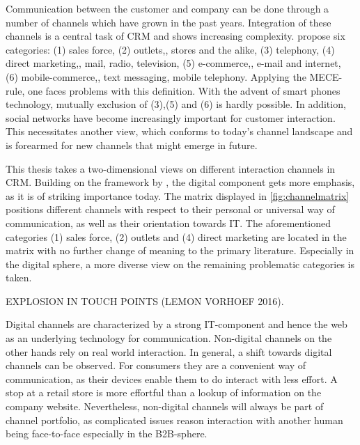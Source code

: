 		Communication between the customer and company can be done through a number of channels which have grown in the past years. Integration of these channels is a central task of CRM and shows increasing complexity. \cite{paynefrow2005} propose six categories: (1) sales force, (2) outlets,\ie, stores and the alike, (3) telephony, (4) direct marketing,\ie, mail, radio, television, (5) e-commerce,\ie, e-mail and internet, (6) mobile-commerce,\ie, text messaging, mobile telephony. Applying the \acrfull{MECE}-rule, one faces problems with this definition. With the advent of smart phones technology, mutually exclusion of (3),(5) and (6) is hardly possible. In addition, social networks have become increasingly important for customer interaction. This necessitates another view, which conforms to today's channel landscape and is forearmed for new channels that might emerge in future. 
		
		This thesis takes a two-dimensional views on different interaction channels in CRM. Building on the framework by \citeauthor{paynefrow2005}, the digital component gets more emphasis, as it is of striking importance today. The matrix displayed in \ref{fig:channelmatrix} positions different channels with respect to their personal or universal way of communication, as well as their orientation towards IT. The aforementioned categories (1) sales force, (2) outlets and (4) direct marketing are located in the matrix with no further change of meaning to the primary literature. Especially in the digital sphere, a more diverse view on the remaining problematic categories is taken.
		
		
		EXPLOSION IN TOUCH POINTS (LEMON VORHOEF 2016).
		
		Digital channels are characterized by a strong IT-component and hence the web as an underlying technology for communication. Non-digital channels on the other hands rely on real world interaction. In general, a shift towards digital channels can be observed. For consumers they are a convenient way of communication, as their devices enable them to do interact with less effort. A stop at a retail store is more effortful than a lookup of information on the company website. Nevertheless, non-digital channels will always be part of channel portfolio, as complicated issues reason interaction with another human being face-to-face especially in the B2B-sphere. 
		
